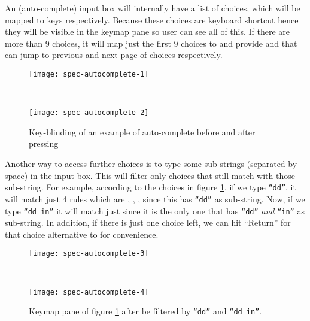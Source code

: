 \documentclass[master.tex]{subfiles}
\begin{document}
An (auto-complete) input box will internally have a list of choices, which will
be mapped to keys  respectively. Because these choices are
keyboard shortcut hence they will be visible in the keymap pane so user can see all
of this. If there are more than 9 choices, it will map just the first 9 choices to
 and provide \pkbd{Alt-[} and \pkbd{Alt-]} that can jump to
previous and next page of choices respectively.

\begin{figure}[H]
    \centering

\begin{minipage}{0.35\textwidth}
\begin{flushleft}
    \texttt{[image: spec-autocomplete-1]}
\end{flushleft}
\end{minipage}
~
\begin{minipage}{0.35\textwidth}
\begin{flushright}
    \texttt{[image: spec-autocomplete-2]}
\end{flushright}
\end{minipage}
\caption{Key-blinding of an example of auto-complete before and after pressing \pkbd{Alt-]}}
\label{fig:specification-autocomplete-choices}
\end{figure}

Another way to access further choices is to type some sub-strings (separated by
space) in the input box. This will filter only choices that still match with
those sub-string. For example, according to the choices in figure
\ref{fig:specification-autocomplete-choices}, if we type \texttt{``dd''}, it
will match just 4 rules which are , ,
,  since this has \texttt{``dd''} as
sub-string. Now, if we type \texttt{``dd in''} it will match just
 since it is the only one that has \texttt{``dd''} \emph{and}
\texttt{``in''} as sub-string. In addition, if there is just one choice left, we
can hit ``Return'' for that choice alternative to  for convenience.

\begin{figure}[H]
    \centering

\begin{minipage}{0.35\textwidth}
\begin{flushleft}
    \texttt{[image: spec-autocomplete-3]}
\end{flushleft}
\end{minipage}
~
\begin{minipage}{0.35\textwidth}
\begin{flushright}
    \texttt{[image: spec-autocomplete-4]}
\end{flushright}
\end{minipage}
\caption{Keymap pane of figure \ref{fig:specification-autocomplete-choices}
  after be filtered by \texttt{``dd''} and \texttt{``dd in''}.}
\label{fig:specification-autocomplete-choices-filtered}
\end{figure}
\end{document}
